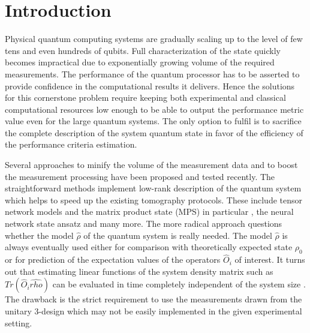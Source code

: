 \documentclass[%
 reprint,
 amsmath,amssymb,
 aps,
]{revtex4-2}
\begin{document}
\section{\label{sec:intro}Introduction}
Physical quantum computing systems are gradually scaling up to the level of few tens and even hundreds of qubits. Full characterization of the state quickly becomes impractical due to exponentially growing volume of the required measurements. The performance of the quantum processor has to be asserted to provide confidence in the computational results it delivers. Hence the solutions for this cornerstone problem require keeping both experimental and classical computational resources low enough to be able to output the performance metric value even for the large quantum systems. The only option to fulfil is to sacrifice the complete description of the system quantum state in favor of the efficiency of the performance criteria estimation.

Several approaches to minify the volume of the measurement data and to boost the measurement processing have been proposed and tested recently. The straightforward methods implement low-rank description of the quantum system which helps to speed up the existing tomography protocols. These include tensor network models \cite{Orus2014} and the matrix product state (MPS) in particular \cite{MPS}, the neural network state ansatz \cite{Troyer2017} and many more. The more radical approach questions whether the model $\hat{\rho}$ of the quantum system is really needed. The model $\hat{\rho}$ is always eventually used either for comparison with theoretically expected state $\rho_{0}$ or for prediction of the expectation values of the operators $\hat{O}_{i}$ of interest. It turns out that estimating linear functions of the system density matrix such as $Tr(\hat{O}_{i}\hat{rho})$ can be evaluated in time completely independent of the system size \cite{Kueng2020}. The drawback is the strict requirement to use the measurements drawn from the unitary 3-design which may not be easily implemented in the given experimental setting. 
\end{document}
